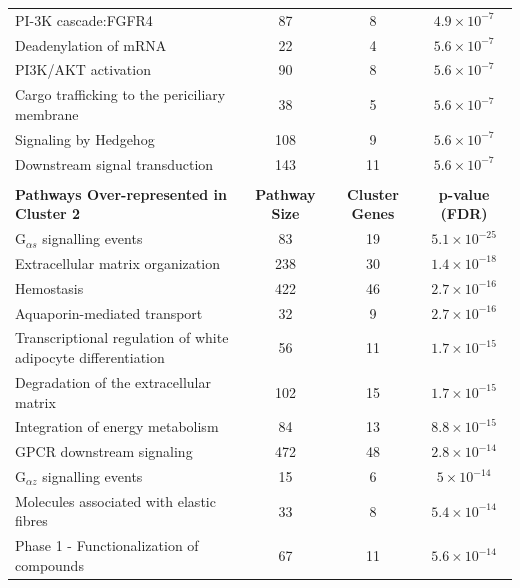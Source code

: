 \begin{table}[!hp]
{\begin{tabular}{lccc}
  PI-3K cascade:FGFR4 &  87 &   8 & $4.9 \times 10^{-7}$ \\ 
  \rowcolor{Cluster_Blue!15} 
  Deadenylation of mRNA &  22 &   4 & $5.6 \times 10^{-7}$ \\ 
  \rowcolor{Cluster_Blue!20} 
  PI3K/AKT activation &  90 &   8 & $5.6 \times 10^{-7}$ \\ 
  \rowcolor{Cluster_Blue!15} 
  Cargo trafficking to the periciliary membrane &  38 &   5 & $5.6 \times 10^{-7}$ \\ 
  \rowcolor{Cluster_Blue!20} 
  Signaling by Hedgehog & 108 &   9 & $5.6 \times 10^{-7}$ \\ 
  \rowcolor{Cluster_Blue!15} 
  Downstream signal transduction & 143 &  11 & $5.6 \times 10^{-7}$ \\ 
  \hline
  \\
  \cellcolor{white} \large{\textbf{Pathways Over-represented in Cluster 2}} & \large{\textbf{Pathway Size}} & \large{\textbf{Cluster Genes}} & \large{\textbf{p-value (FDR)}} \\ %
  \hline
  \rowcolor{Cluster_Green!20}
  G$_{\alpha s}$ signalling events &  83 &  19 & $5.1 \times 10^{-25}$ \\ 
  \rowcolor{Cluster_Green!15}
  Extracellular matrix organization & 238 &  30 & $1.4 \times 10^{-18}$ \\ 
  \rowcolor{Cluster_Green!20} 
  Hemostasis & 422 &  46 & $2.7 \times 10^{-16}$ \\ 
  \rowcolor{Cluster_Green!15} 
  Aquaporin-mediated transport &  32 &   9 & $2.7 \times 10^{-16}$ \\ 
  \rowcolor{Cluster_Green!20} 
  Transcriptional regulation of white adipocyte differentiation &  56 &  11 & $1.7 \times 10^{-15}$ \\ 
  \rowcolor{Cluster_Green!15} 
  Degradation of the extracellular matrix & 102 &  15 & $1.7 \times 10^{-15}$ \\ 
  \rowcolor{Cluster_Green!20} 
  Integration of energy metabolism &  84 &  13 & $8.8 \times 10^{-15}$ \\ 
  \rowcolor{Cluster_Green!15} 
  GPCR downstream signaling & 472 &  48 & $2.8 \times 10^{-14}$ \\ 
  \rowcolor{Cluster_Green!20} 
  G$_{\alpha z}$ signalling events &  15 &   6 & $5 \times 10^{-14}$ \\ 
  \rowcolor{Cluster_Green!15} 
  Molecules associated with elastic fibres &  33 &   8 & $5.4 \times 10^{-14}$ \\ 
  \rowcolor{Cluster_Green!20} 
  Phase 1 - Functionalization of compounds &  67 &  11 & $5.6 \times 10^{-14}$ \\ 

\end{tabular}}
\end{table}
